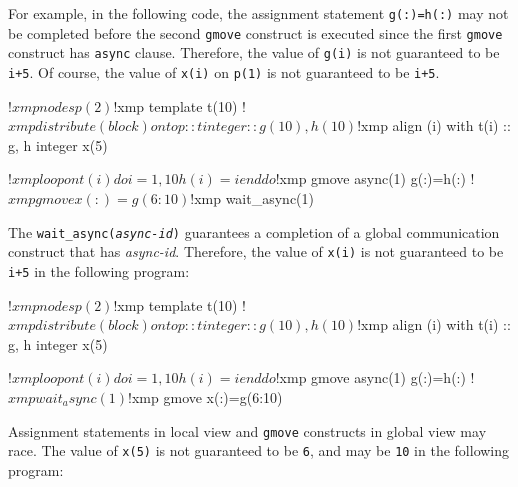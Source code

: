 For example, in the following code, the assignment statement
\texttt{g(:)=h(:)} may not be completed before the second
\texttt{gmove} construct is executed since the first \texttt{gmove}
construct has \texttt{async} clause.  Therefore, the value of
\texttt{g(i)} is not guaranteed to be \texttt{i+5}.  Of course, the
value of \texttt{x(i)} on \texttt{p(1)} is not guaranteed to be
\texttt{i+5}.
\begin{center}
\begin{XFexample}
!$xmp nodes p(2)
!$xmp template t(10)
!$xmp distribute (block) onto p :: t
      integer :: g(10), h(10)
!$xmp align (i) with t(i) :: g, h
      integer x(5)

!$xmp loop on t(i)
      do i=1,10
      h(i)=i
      end do

!$xmp gmove async(1)
      g(:)=h(:)
!$xmp gmove
      x(:)=g(6:10)
!$xmp wait_async(1)
\end{XFexample}
\end{center}

The \texttt{wait\_async(\textit{async-id})} guarantees a completion of
a global communication construct that has \textit{async-id}.
Therefore, the value of \texttt{x(i)} is not guaranteed to be
\texttt{i+5} in the following program:
\begin{center}
\begin{XFexample}
!$xmp nodes p(2)
!$xmp template t(10)
!$xmp distribute (block) onto p :: t
      integer :: g(10), h(10)
!$xmp align (i) with t(i) :: g, h
      integer x(5)

!$xmp loop on t(i)
      do i=1,10
      h(i)=i
      end do

!$xmp gmove async(1)
      g(:)=h(:)
!$xmp wait_async(1)
!$xmp gmove
      x(:)=g(6:10)
\end{XFexample}
\end{center}

Assignment statements in local view and \texttt{gmove} constructs in
global view may race.  The value of \texttt{x(5)} is not guaranteed to
be \texttt{6}, and may be \texttt{10} in the following program:
\begin{center}
\end{center}

